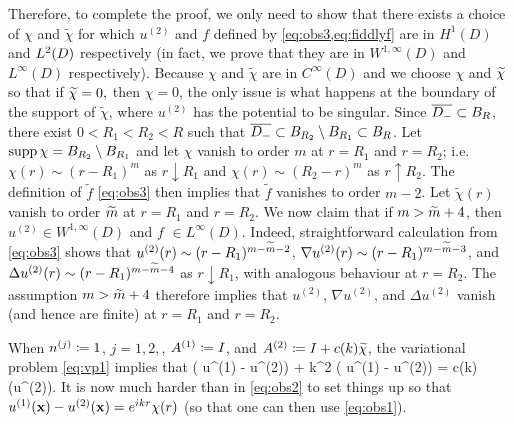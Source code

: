 Therefore, to complete the proof, we only need to show that there exists a choice of $\chi$ and $\widetilde{\chi}$ for which $u^{(2)}$ and $f$ defined by \cref{eq:obs3,eq:fiddlyf} are 
in $H^{1}(D)$ and $\LtD$ respectively (in fact, we prove that they are in $W^{1,\infty}(D)$ and $L^\infty(D)$ respectively).
Because $\chi$ and $\widetilde{\chi}$ are in $C^\infty(D)$ and we choose $\chi$ and $\widetilde{\chi}$ so that if $\widetilde{\chi}=0,$ then $\chi=0$, the only issue is what happens at the boundary of the support of $\widetilde{\chi}$, where $u^{(2)}$ has the potential to be singular.
Since $\overline{D_{-}} \subset B_{R}$, there exist $0<R_1<R_2<R$ such that $\overline{D_{-}} \subset B_{R_2}\setminus B_{R_1} \subset B_{R}$. Let $\operatorname{supp} \chi = B_{R_2}\setminus B_{R_1}$ and let $\chi$ vanish to order $m$ at $r= R_1$ and $r=R_2$; i.e.~$\chi(r) \sim (r-R_1)^m$ as $r \downarrow R_1$ and 
$\chi(r) \sim (R_2-r)^m$ as $r \uparrow R_2$. The definition of $\widetilde{f}$ \cref{eq:obs3} then implies that $\widetilde{f}$ vanishes to order $m-2$. Let $\widetilde{\chi}(r)$ vanish to order $\widetilde{m}$ at $r= R_1$ and $r=R_2$. 
We now claim that if $m >\widetilde{m}+4$, then $u^{(2)}\in W^{1,\infty}(D)$ and $f$ $\in L^\infty(D)$. Indeed,  
straightforward calculation from \cref{eq:obs3} shows that  $u^{(2)}(r) \sim (r-R_1)^{m-\widetilde{m}-2}$, $\nabla u^{(2)}(r) \sim (r-R_1)^{m-\widetilde{m}-3}$, and $\Delta u^{(2)}(r) \sim (r-R_1)^{m-\widetilde{m}-4}$ as $r \downarrow R_1$, with analogous behaviour at $r=R_2$.
The assumption 
$m >\widetilde{m}+4$ therefore implies that $u^{(2)}$, $\nabla u ^{(2)}$, and $\Delta u^{(2)}$ vanish (and hence are finite) at $r=R_1$ and $r=R_2$.
\epf

When $n^{(j)}\coloneqq1$, $j=1,2,$, ${A}^{(1)}\coloneqq I$, and ${A}^{(2)}\coloneqq I + c(k)\widetilde{\chi}$, the variational problem \cref{eq:vp1} implies that 
\beq\label{eq:obs2}
\Delta \big( u^{(1)} - u^{(2)}\big) + k^2 \big( u^{(1)} - u^{(2)}\big) = c(k)\nabla\cdot \big(\widetilde{\chi}\nabla u^{(2)}\big).
\eeq
It is now much harder than in \cref{eq:obs2} to set things up so that $ u^{(1)}(\mathbf{x}) - u^{(2)}(\mathbf{x})=e^{i kr}\chi(r)$ (so that one can then use \cref{eq:obs1}).
\ere


